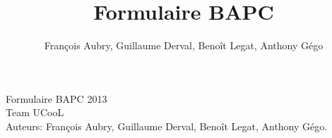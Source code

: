 \documentclass[2pt,a4paper,twoside ]{article}
\author{François Aubry, Guillaume Derval, Benoît Legat, Anthony Gégo}
\title{Formulaire BAPC}
\begin{document}
\begin{multicols}{2}
{\Huge Formulaire BAPC 2013}\\
{\Large Team UCooL}\\
Auteurs: François Aubry, Guillaume Derval, Benoît Legat, Anthony Gégo.
\tableofcontents





\end{multicols}
\end{document}
